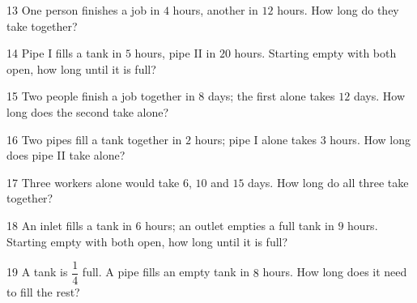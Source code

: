 \gap
\begin{probbox}{13}{\relax}
One person finishes a job in $4$ hours, another in $12$ hours. How long do they take together?
\end{probbox}
\gap
\begin{probbox}{14}{\relax}
Pipe I fills a tank in $5$ hours, pipe II in $20$ hours. Starting empty with both open, how long until it is full?
\end{probbox}
\gap
\begin{probbox}{15}{\relax}
Two people finish a job together in $8$ days; the first alone takes $12$ days. How long does the second take alone?
\end{probbox}
\gap
\begin{probbox}{16}{\relax}
Two pipes fill a tank together in $2$ hours; pipe I alone takes $3$ hours. How long does pipe II take alone?
\end{probbox}
\gap
\begin{probbox}{17}{\relax}
Three workers alone would take $6$, $10$ and $15$ days. How long do all three take together?
\end{probbox}
\gap
\begin{probbox}{18}{\relax}
An inlet fills a tank in $6$ hours; an outlet empties a full tank in $9$ hours. Starting empty with both open, how long until it is full?
\end{probbox}
\gap
\begin{probbox}{19}{\relax}
A tank is $\dfrac14$ full. A pipe fills an empty tank in $8$ hours. How long does it need to fill the rest?
\end{probbox}
